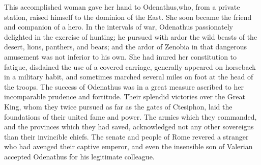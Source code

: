 


This accomplished woman gave her hand to Odenathus,\footnotemark[551] who, from
a private station, raised himself to the dominion of the East.
She soon became the friend and companion of a hero. In the
intervals of war, Odenathus passionately delighted in the
exercise of hunting; he pursued with ardor the wild beasts of the
desert, lions, panthers, and bears; and the ardor of Zenobia in
that dangerous amusement was not inferior to his own. She had
inured her constitution to fatigue, disdained the use of a
covered carriage, generally appeared on horseback in a military
habit, and sometimes marched several miles on foot at the head of
the troops. The success of Odenathus was in a great measure
ascribed to her incomparable prudence and fortitude. Their
splendid victories over the Great King, whom they twice pursued
as far as the gates of Ctesiphon, laid the foundations of their
united fame and power. The armies which they commanded, and the
provinces which they had saved, acknowledged not any other
sovereigns than their invincible chiefs. The senate and people of
Rome revered a stranger who had avenged their captive emperor,
and even the insensible son of Valerian accepted Odenathus for
his legitimate colleague.


